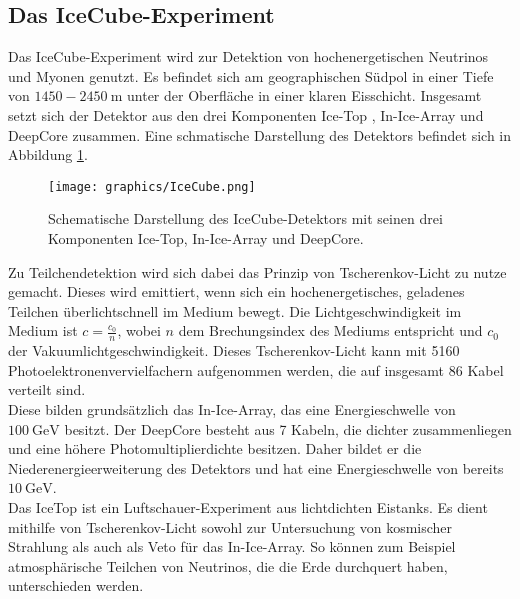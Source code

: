 \subsection{Das IceCube-Experiment}
Das IceCube-Experiment wird zur Detektion von hochenergetischen Neutrinos und Myonen genutzt. Es befindet sich am geographischen Südpol in einer Tiefe von $1450-\SI{2450}{\meter}$ unter der Oberfläche in einer klaren Eisschicht. Insgesamt setzt sich der Detektor aus den drei Komponenten Ice-Top \cite{3246225}, In-Ice-Array \cite{ACHTERBERG2006155} und DeepCore \cite{2143409} zusammen. Eine schmatische Darstellung des Detektors befindet sich in Abbildung \ref{fig:Ice}.
\begin{figure}
  \centering
  \texttt{[image: graphics/IceCube.png]}
  \caption{Schematische Darstellung des IceCube-Detektors mit seinen drei Komponenten Ice-Top, In-Ice-Array und DeepCore.\cite{IceCube}}
  \label{fig:Ice}
\end{figure}
Zu Teilchendetektion wird sich dabei das Prinzip von Tscherenkov-Licht zu nutze gemacht. Dieses wird emittiert, wenn sich ein hochenergetisches, geladenes Teilchen überlichtschnell im Medium bewegt. Die Lichtgeschwindigkeit im Medium ist $c=\frac{c_{0}}{n}$, wobei $n$ dem Brechungsindex des Mediums entspricht und $c_{0}$ der Vakuumlichtgeschwindigkeit. Dieses Tscherenkov-Licht kann mit 5160 Photoelektronenvervielfachern aufgenommen werden, die auf insgesamt 86 Kabel verteilt sind.\\
Diese bilden grundsätzlich das In-Ice-Array, das eine Energieschwelle von $\SI{100}{\giga\electronvolt}$ besitzt. Der DeepCore besteht aus 7 Kabeln, die dichter zusammenliegen und eine höhere Photomultiplierdichte besitzen. Daher bildet er die Niederenergieerweiterung des Detektors und hat eine Energieschwelle von bereits $\SI{10}{\giga\electronvolt}$.\\
Das IceTop ist ein Luftschauer-Experiment aus lichtdichten Eistanks. Es dient mithilfe von Tscherenkov-Licht sowohl zur Untersuchung von kosmischer Strahlung als auch als Veto für das In-Ice-Array. So können zum Beispiel atmosphärische Teilchen von Neutrinos, die die Erde durchquert haben, unterschieden werden.\\
